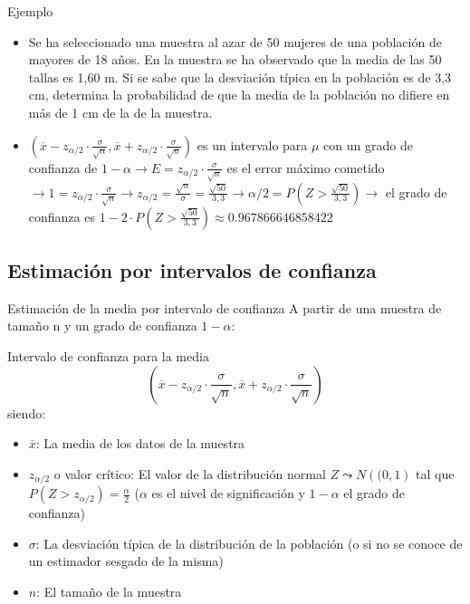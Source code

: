 \documentclass[11pt,handout]{beamer}
\begin{document}
\begin{frame}{Ejemplo}
\begin{itemize}[<+->]
    \item  Se ha seleccionado una muestra al azar de 50 mujeres de una población de mayores
de 18 años. En la muestra se ha observado que la media de las 50 tallas es 1,60 m. Si se sabe que
la desviación típica en la población es de 3,3 cm, determina la probabilidad de que la
media de la población no difiere en más de 1 cm de la de la muestra. 
    \item $\left( \overline{x} - z_{\alpha / 2}\cdot \frac{\sigma}{\sqrt{n}} ,  \overline{x} + z_{\alpha / 2}\cdot \frac{\sigma}{\sqrt{n}} \right)$ es un intervalo para $\mu$ con un grado de confianza de $1-\alpha \to E=z_{\alpha / 2}\cdot \frac{\sigma}{\sqrt{n}}$ es el error máximo cometido $\to 1=z_{\alpha / 2}\cdot \frac{\sigma}{\sqrt{n}} \to z_{\alpha / 2}=\frac{\sqrt{n}}{\sigma}=\frac{\sqrt{50}}{3,3} \to  \alpha / 2=P(Z>\frac{\sqrt{50}}{3,3}) \to$ el grado de confianza es  $1-2\cdot P(Z>\frac{\sqrt{50}}{3,3})\approx 0.967866646858422$
    
\end{itemize}
\end{frame}



\subsection{Estimación por intervalos de confianza}

\begin{frame}
{Estimación de la media por intervalo de confianza}
A partir de una muestra de tamaño n y un grado de confianza $1-\alpha$: 
\begin{block}{Intervalo de confianza para la media}
$$ \left( \overline{x} - z_{\alpha / 2}\cdot \frac{\sigma}{\sqrt{n}} ,  \overline{x} + z_{\alpha / 2}\cdot \frac{\sigma}{\sqrt{n}}
\right)$$
siendo: \begin{itemize}
\item $\overline{x}$: La media de los datos de la muestra
\item $z_{\alpha / 2}$ o valor crítico: El valor de la distribución normal  $Z\leadsto N\left((0,1\right)$ tal que $P(Z>z_{\alpha / 2})=\frac{\alpha}{2}$ ($\alpha$ es el nivel de significación y $1-\alpha$ el grado de confianza)
\item $\sigma$: La desviación típica de la distribución de la población (o si no se conoce de un estimador sesgado de la misma)
\item $n$: El tamaño de la muestra
\end{itemize}
\end{block}
\pause

\end{frame}
\end{document}

